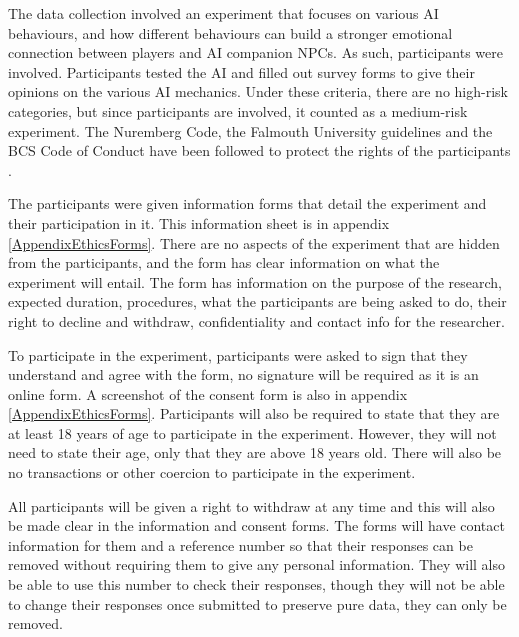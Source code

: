 \documentclass{IEEEtran}
\begin{document}
The data collection involved an experiment that focuses on various AI behaviours, and how different behaviours can build a stronger emotional connection between players and AI companion NPCs. As such, participants were involved. Participants tested the AI and filled out survey forms to give their opinions on the various AI mechanics. Under these criteria, there are no high-risk categories, but since participants are involved, it counted as a medium-risk experiment. The Nuremberg Code, the Falmouth University guidelines and the BCS Code of Conduct have been followed to protect the rights of the participants \cite{germany1949trials, BCSConductCode}.

The participants were given information forms that detail the experiment and their participation in it. This information sheet is in appendix \ref{AppendixEthicsForms}. There are no aspects of the experiment that are hidden from the participants, and the form has clear information on what the experiment will entail. The form has information on the purpose of the research, expected duration, procedures, what the participants are being asked to do, their right to decline and withdraw, confidentiality and contact info for the researcher.

To participate in the experiment, participants were asked to sign that they understand and agree with the form, no signature will be required as it is an online form. A screenshot of the consent form is also in appendix \ref{AppendixEthicsForms}. Participants will also be required to state that they are at least 18 years of age to participate in the experiment. However, they will not need to state their age, only that they are above 18 years old. There will also be no transactions or other coercion to participate in the experiment.

All participants will be given a right to withdraw at any time and this will also be made clear in the information and consent forms. The forms will have contact information for them and a reference number so that their responses can be removed without requiring them to give any personal information. They will also be able to use this number to check their responses, though they will not be able to change their responses once submitted to preserve pure data, they can only be removed.

\end{document}

